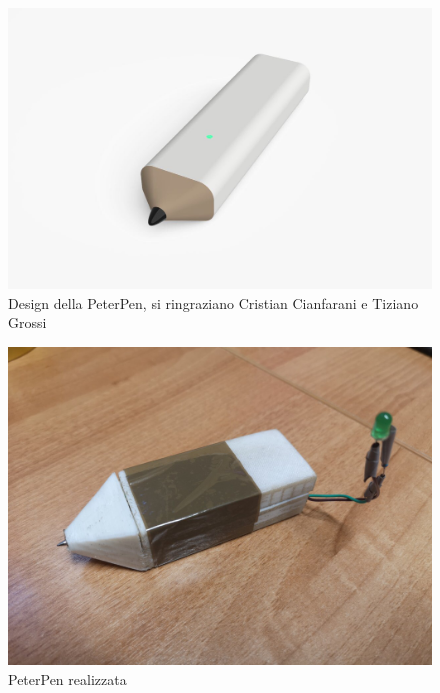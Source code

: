 \documentclass[8pt,notitlepage]{report}
\begin{document}
		\begin{figure}[H]
			\begin{center}
				\includegraphics[scale=.1]{design}
				\caption{Design della PeterPen, si ringraziano Cristian Cianfarani e Tiziano Grossi}
			\end{center}
		\end{figure}		
		
		\begin{figure}[H]
			\begin{center}
				\includegraphics[scale=.105]{peterpen}
				\caption{PeterPen realizzata}
			\end{center}
		\end{figure}

		
\end{document}
